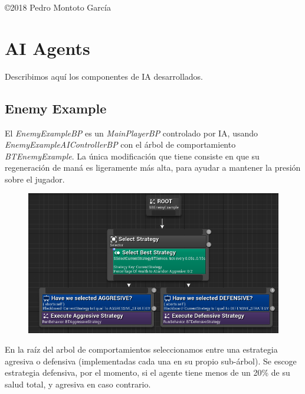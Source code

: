 \documentclass[12pt]{article}
\begin{document}
\vfill %

{\centering \hfill \copyright 2018 Pedro Montoto García} \\


\clearpage

\setlength{\voffset}{0cm}
\setlength{\parindent}{1cm}
\setcounter{page}{1}

\section{AI Agents}

Describimos aquí los componentes de IA desarrollados.

\subsection{Enemy Example}

El \textit{\emph{EnemyExampleBP}} es un \textit{\emph{MainPlayerBP}} controlado por IA, usando \textit{\emph{EnemyExampleAIControllerBP}} con el árbol de comportamiento \textit{\emph{BTEnemyExample}}. La única modificación que tiene consiste en que su regeneración de maná es ligeramente más alta, para ayudar a mantener la presión sobre el jugador.

\begin{figure}[h]
    \centering
    \includegraphics[width=1\textwidth]{base_behavior_tree}
\end{figure}

En la raíz del arbol de comportamientos seleccionamos entre una estrategia agresiva o defensiva (implementadas cada una en su propio sub-árbol). Se escoge estrategia defensiva, por el momento, si el agente tiene menos de un 20\% de su salud total, y agresiva en caso contrario.
\end{document}
